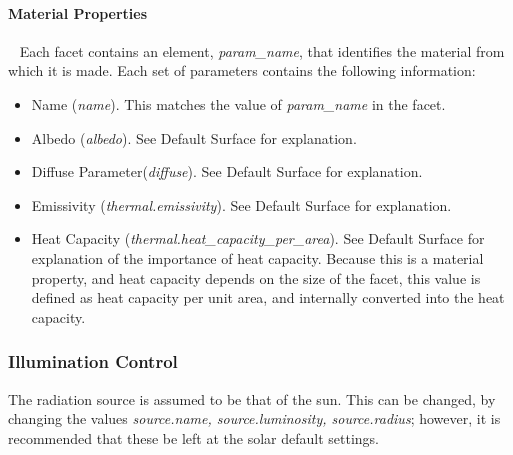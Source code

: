 \paragraph{Material Properties} \ \newline
Each facet contains an element, \textit{param\_name}, that identifies the material from which it is made.  Each set of parameters contains the following information:
\begin{itemize}
\item {Name (\textit{name})}. \newline
This matches the value of \textit{param\_name} in the facet.
\item{Albedo (\textit{albedo})}. \newline
See Default Surface for explanation.
\item{Diffuse Parameter(\textit{diffuse})}. \newline
See Default Surface for explanation.
\item{Emissivity (\textit{thermal.emissivity})}.  \newline
See Default Surface for explanation.
\item{Heat Capacity (\textit{thermal.heat\_capacity\_per\_area})}.  \newline
See Default Surface for explanation of the importance of heat capacity.  Because this is a material property, and heat capacity depends on the size of the facet, this value is defined as heat capacity per unit area, and internally converted into the heat capacity.
\end{itemize}


\subsubsection{Illumination Control}

The radiation source is assumed to be that of the sun.  This can be changed, by changing the values \textit{source.name, source.luminosity, source.radius}; however, it is recommended that these be left at the solar default settings.

